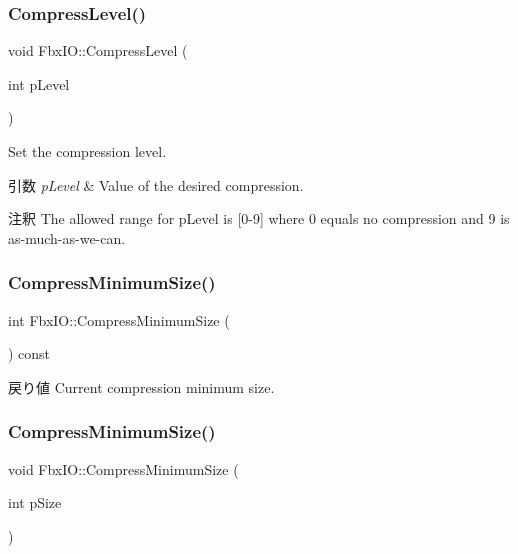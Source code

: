\subsubsection{\texorpdfstring{Compress\+Level()}{CompressLevel()}\hspace{0.1cm}{\footnotesize\ttfamily [2/2]}}
{\footnotesize\ttfamily void Fbx\+I\+O\+::\+Compress\+Level (\begin{DoxyParamCaption}\item[{int}]{p\+Level }\end{DoxyParamCaption})}

Set the compression level. 
\begin{DoxyParams}{引数}
{\em p\+Level} & Value of the desired compression. \\
\hline
\end{DoxyParams}
\begin{DoxyRemark}{注釈}
The allowed range for p\+Level is \mbox{[}0-\/9\mbox{]} where 0 equals no compression and 9 is as-\/much-\/as-\/we-\/can. 
\end{DoxyRemark}
\mbox{\label{class_fbx_i_o_aa852808fd8920701f6b8df769d5368f6}} 
\subsubsection{\texorpdfstring{Compress\+Minimum\+Size()}{CompressMinimumSize()}\hspace{0.1cm}{\footnotesize\ttfamily [1/2]}}
{\footnotesize\ttfamily int Fbx\+I\+O\+::\+Compress\+Minimum\+Size (\begin{DoxyParamCaption}{ }\end{DoxyParamCaption}) const}

\begin{DoxyReturn}{戻り値}
Current compression minimum size. 
\end{DoxyReturn}
\mbox{\label{class_fbx_i_o_ab8b60eb39e05136271ef1258a78a4550}} 
\subsubsection{\texorpdfstring{Compress\+Minimum\+Size()}{CompressMinimumSize()}\hspace{0.1cm}{\footnotesize\ttfamily [2/2]}}
{\footnotesize\ttfamily void Fbx\+I\+O\+::\+Compress\+Minimum\+Size (\begin{DoxyParamCaption}\item[{int}]{p\+Size }\end{DoxyParamCaption})}

